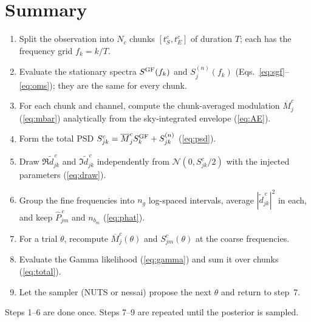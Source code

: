 \documentclass[11pt,a4paper]{article}
\newcommand{\Pbar}{\hat{P}}
\newcommand{\Mbar}{\overline{M}}
\begin{document}
\section{Summary}

\begin{keybox}
\begin{enumerate}
  \item Split the observation into $N_c$ chunks $[t^c_S,t^c_E]$ of duration $T$;
        each has the frequency grid $f_k=k/T$.
  \item Evaluate the stationary spectra $S^{\rm GF}(f_k)$ and $S^{(n)}_j(f_k)$
        (Eqs.~\ref{eq:sgf}--\ref{eq:oms}); they are the same for every chunk.
  \item For each chunk and channel, compute the chunk-averaged modulation
        $\Mbar^c_j$ (\cref{eq:mbar}) analytically from the sky-integrated envelope
        (\cref{eq:AE}).
  \item Form the total PSD $S^c_{jk}=\Mbar^c_jS^{\rm GF}_k+S^{(n)}_{jk}$ (\cref{eq:psd}).
  \item Draw $\Re\tilde d^{\,c}_{jk}$ and $\Im\tilde d^{\,c}_{jk}$ independently from
        $\mathcal{N}(0,S^c_{jk}/2)$ with the injected parameters (\cref{eq:draw}).
  \item Group the fine frequencies into $n_g$ log-spaced intervals, average
        $|\tilde d^{\,c}_{jk}|^2$ in each, and keep $\Pbar^{\,c}_{jm}$ and
        $n_{b_m}$ (\cref{eq:phat}).
  \item For a trial $\theta$, recompute $\Mbar^c_j(\theta)$ and $S^c_{jm}(\theta)$ at
        the coarse frequencies.
  \item Evaluate the Gamma likelihood (\cref{eq:gamma}) and sum it over chunks
        (\cref{eq:total}).
  \item Let the sampler (NUTS or nessai) propose the next $\theta$ and return to
        step~7.
\end{enumerate}
Steps 1--6 are done once. Steps 7--9 are repeated until the posterior is sampled.
\end{keybox}

\end{document}
